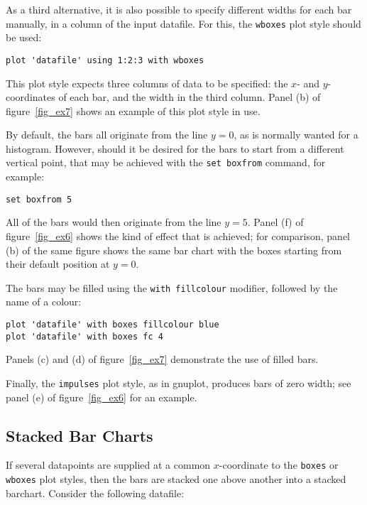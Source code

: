 \documentclass[a4paper,onecolumn,11pt]{book}
\begin{document}
As a third alternative, it is also possible to specify different widths for
each bar manually, in a column of the input datafile. For this, the
\texttt{wboxes} plot style
should be used:

\begin{verbatim} 
plot 'datafile' using 1:2:3 with wboxes
\end{verbatim}

\noindent This plot style expects three columns of data to be specified: the
$x$- and $y$-coordinates of each bar, and the width in the third column. Panel
(b) of figure~\ref{fig_ex7} shows an example of this plot style in use.

By default, the bars all originate from the line $y=0$, as is normally wanted
for a histogram. However, should it be desired for the bars to start from a
different vertical point, that may be achieved with the \texttt{set boxfrom}
command, for example:

\begin{verbatim} 
set boxfrom 5
\end{verbatim}

\noindent All of the bars would then originate from the line $y=5$. Panel (f)
of figure~\ref{fig_ex6} shows the kind of effect that is achieved; for
comparison, panel (b) of the same figure shows the same bar chart with the
boxes starting from their default position at $y=0$.

The bars may be filled using the \texttt{with fillcolour} modifier, followed by the name of a
colour:

\begin{verbatim} 
plot 'datafile' with boxes fillcolour blue
plot 'datafile' with boxes fc 4
\end{verbatim}

\noindent Panels (c) and (d) of figure~\ref{fig_ex7} demonstrate the use of
filled bars.

Finally, the \texttt{impulses} plot style, as in gnuplot, produces bars of zero
width; see panel (e) of figure~\ref{fig_ex6} for an example.

\subsection{Stacked Bar Charts}

If several datapoints are supplied at a common $x$-coordinate to the
\texttt{boxes} or \texttt{wboxes} plot styles, then the bars are stacked one
above another into a stacked barchart. Consider the following datafile:
\end{document}
